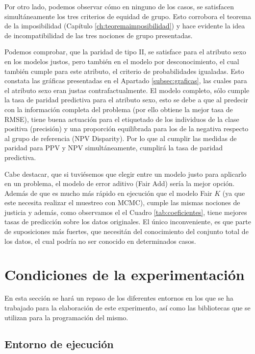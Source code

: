 \documentclass[oneside,openright,titlepage,numbers=noenddot,openany,headinclude,footinclude=true,
cleardoublepage=empty,abstractoff,BCOR=5mm,paper=a4,fontsize=12pt,main=spanish]{scrreprt}
\begin{document}
Por otro lado, podemos observar cómo en ninguno de los casos, se satisfacen simultáneamente los tres criterios de equidad de grupo. Esto corrobora el teorema de la imposibilidad (Capítulo \ref{ch:teoremaimposibilidad}) y hace evidente la idea de incompatibilidad de las tres nociones de grupo presentadas.

Podemos comprobar, que la paridad de tipo II, se satisface para el atributo sexo en los modelos justos, pero también en el modelo por desconocimiento, el cual también cumple para este atributo, el criterio de probabilidades igualadas. Esto constata las gráficas presentadas en el Apartado \ref{subsec:graficas}, las cuales para el atributo sexo eran justas contrafactualmente. El modelo completo, sólo cumple la tasa de paridad predictiva para el atributo sexo, esto se debe a que al predecir con la información completa del problema (por ello obtiene la mejor tasa de RMSE), tiene buena actuación para el etiquetado de los individuos de la clase positiva (precisión) y una proporción equilibrada para los de la negativa respecto al grupo de referencia (NPV Disparity). Por lo que al cumplir las medidas de paridad para PPV y NPV simultáneamente, cumplirá la tasa de paridad predictiva.

Cabe destacar, que si tuviésemos que elegir entre un modelo justo para aplicarlo en un problema, el modelo de error aditivo (Fair Add) sería la mejor opción. Además de que es mucho más rápido en ejecución que el modelo Fair $K$ (ya que este necesita realizar el muestreo con MCMC), cumple las mismas nociones de justicia y además, como observamos el el Cuadro \ref{tab:coeficientes}, tiene mejores tasas de predicción sobre los datos originales. El único inconveniente, es que parte de suposiciones más fuertes, que necesitán del conocimiento del conjunto total de los datos, el cual podría no ser conocido en determinados casos.

\section{Condiciones de la experimentación}

En esta sección se hará un repaso de los diferentes entornos en los que se ha trabajado para la elaboración de este experimento, así como las bibliotecas que se utilizan para la programación del mismo.

\subsection{Entorno de ejecución}
\end{document}

